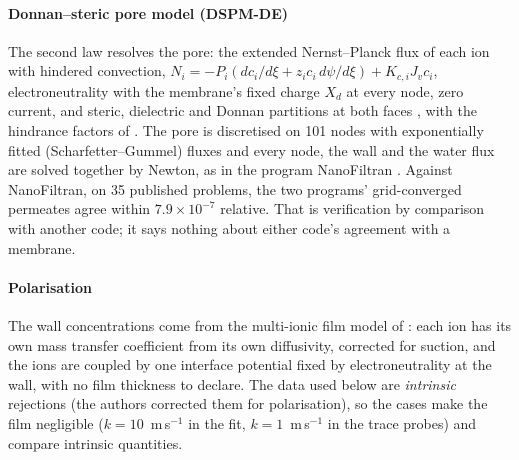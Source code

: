 \documentclass[preprint,12pt]{elsarticle}
\begin{document}
\paragraph{Donnan--steric pore model (DSPM-DE)}  The second law resolves the
pore: the extended Nernst--Planck flux of each ion with hindered
convection, $N_i = -P_i(dc_i/d\xi + z_i c_i\,d\psi/d\xi) + K_{c,i}J_v c_i$,
electroneutrality with the membrane's fixed charge $X_d$ at every node,
zero current, and steric, dielectric and Donnan partitions at both faces
\citep{bowen2002}, with the hindrance factors of \citet{dechadilok2006}.
The pore is discretised on 101 nodes with exponentially fitted
(Scharfetter--Gummel) fluxes \citep{scharfetter1969} and every node, the
wall and the water flux are solved together by Newton, as in the program
NanoFiltran \citep{geraldes2008}.  Against NanoFiltran, on 35 published
problems, the two programs' grid-converged permeates agree within
$7.9\times10^{-7}$ relative.  That is verification by comparison with
another code; it says nothing about either code's agreement with a
membrane.

\paragraph{Polarisation}  The wall concentrations come from the
multi-ionic film model of \citet{geraldes2007}: each ion has its own mass
transfer coefficient from its own diffusivity, corrected for suction, and
the ions are coupled by one interface potential fixed by electroneutrality
at the wall, with no film thickness to declare.  The data used below are
\emph{intrinsic} rejections (the authors corrected them for
polarisation), so the cases make the film negligible
($k = 10$~m\,s$^{-1}$ in the fit, $k = 1$~m\,s$^{-1}$ in the trace
probes) and compare intrinsic quantities.
\end{document}
